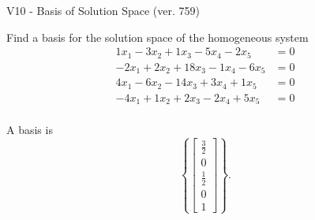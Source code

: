 \begin{exercise}
  \begin{exerciseTitle}V10 - Basis of Solution Space (ver. 759)\end{exerciseTitle}
  \begin{exerciseStatement}
    Find a basis for the solution space of the homogeneous system 
\begin{align*}
 1 x_ 1 -3 x_ 2 + 1 x_ 3 -5 x_ 4 -2 x_ 5 &= 0  \\ 
  -2 x_ 1 + 2 x_ 2 + 18 x_ 3 -1 x_ 4 -6 x_ 5 &= 0  \\ 
  4 x_ 1 -6 x_ 2 -14 x_ 3 + 3 x_ 4 + 1 x_ 5 &= 0  \\ 
  -4 x_ 1 + 1 x_ 2 + 2 x_ 3 -2 x_ 4 + 5 x_ 5 &= 0  \\ 
 \end{align*}


 
  \end{exerciseStatement}

  \begin{exerciseAnswer}
   A basis is   
\[\left\{\left[\begin{array}{c}
\frac{3}{2} \\
0 \\
\frac{1}{2} \\
0 \\
1
\end{array}\right]\right\}.\]

  


  \end{exerciseAnswer}
\end{exercise}